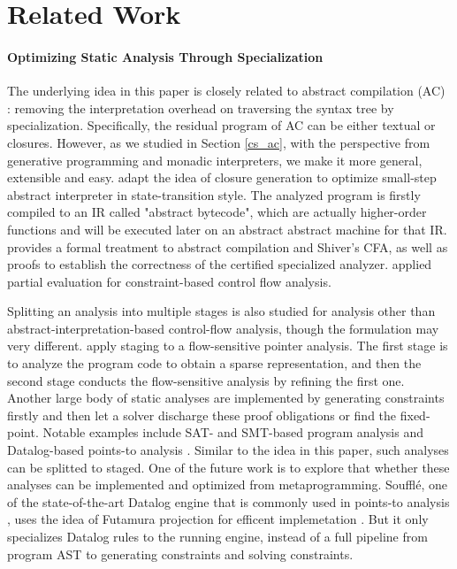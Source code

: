\section{Related Work}

\paragraph{Optimizing Static Analysis Through Specialization}
The underlying idea in this paper is closely related to abstract
compilation (AC) \cite{Boucher:1996:ACN:647473.727587}: removing the
interpretation overhead on traversing the syntax tree by
specialization. Specifically, the residual program of AC can be either
textual or closures. However, as we studied in Section \ref{cs_ac},
with the perspective from generative programming and monadic
interpreters, we make it more general, extensible and easy.
\citet{Johnson:2013:OAA:2500365.2500604} adapt the idea of closure
generation to optimize small-step abstract interpreter in
state-transition style. The analyzed program is firstly compiled to an
IR called "abstract bytecode", which are actually higher-order
functions and will be executed later on an abstract abstract machine
for that IR. \citet{damian1999partial} provides a formal treatment to
abstract compilation and Shiver's CFA, as well as proofs to establish
the correctness of the certified specialized analyzer.
\citet{amtoft1999partial} applied partial evaluation for
constraint-based control flow analysis.

Splitting an analysis into multiple stages is also studied for
analysis other than abstract-interpretation-based control-flow
analysis, though the formulation may very
different. \citet{DBLP:conf/cgo/HardekopfL11} apply staging to a
flow-sensitive pointer analysis. The first stage is to analyze the
program code to obtain a sparse representation, and then the second
stage conducts the flow-sensitive analysis by refining the first
one. Another large body of static analyses are implemented by
generating constraints firstly and then let a solver discharge these
proof obligations or find the fixed-point. Notable examples include
SAT- and SMT-based program analysis
\cite{Gulwani:2008:PAC:1375581.1375616} and Datalog-based points-to
analysis \cite{Smaragdakis:2015:PA:2802194.2802195}.
Similar to the idea in this paper, such analyses can be splitted to
staged.  One of the future work is to explore that whether these
analyses can be implemented and optimized from
metaprogramming. Souffl{\'e}, one of the state-of-the-art Datalog
engine that is commonly used in points-to analysis
\cite{Antoniadis:2017:PDS:3088515.3088522}, uses the idea of Futamura
projection for efficent implemetation \cite{10.1007/978-3-319-41540-6_23}.
But it only specializes Datalog rules to the running engine, instead
of a full pipeline from program AST to generating constraints and
solving constraints.

